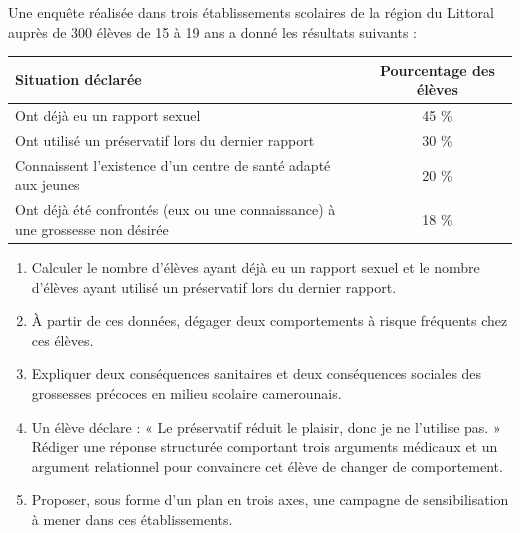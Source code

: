 \documentclass[11pt]{article}
\begin{document}
\begin{exercice}
Une enquête réalisée dans trois établissements scolaires de la région du Littoral auprès de 300 élèves de 15 à 19 ans a donné les résultats suivants :

\begin{center}
\begin{tabularx}{\linewidth}{|X|c|}\hline
\rowcolor{popblueL} \textbf{Situation déclarée} & \textbf{Pourcentage des élèves} \\ \hline
Ont déjà eu un rapport sexuel & 45 \% \\ \hline
Ont utilisé un préservatif lors du dernier rapport & 30 \% \\ \hline
Connaissent l'existence d'un centre de santé adapté aux jeunes & 20 \% \\ \hline
Ont déjà été confrontés (eux ou une connaissance) à une grossesse non désirée & 18 \% \\ \hline
\end{tabularx}
\end{center}

\begin{enumerate}
\item Calculer le nombre d'élèves ayant déjà eu un rapport sexuel et le nombre d'élèves ayant utilisé un préservatif lors du dernier rapport.
\item À partir de ces données, dégager deux comportements à risque fréquents chez ces élèves.
\item Expliquer deux conséquences sanitaires et deux conséquences sociales des grossesses précoces en milieu scolaire camerounais.
\item Un élève déclare : « Le préservatif réduit le plaisir, donc je ne l'utilise pas. » Rédiger une réponse structurée comportant trois arguments médicaux et un argument relationnel pour convaincre cet élève de changer de comportement.
\item Proposer, sous forme d'un plan en trois axes, une campagne de sensibilisation à mener dans ces établissements.
\end{enumerate}
\end{exercice}
\end{document}
